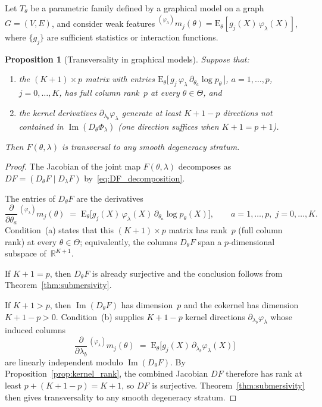 \documentclass[11pt,a4paper]{article}
\newtheorem{proposition}[theorem]{Proposition}
\newcommand{\E}{\mathrm{E}}
\newcommand{\R}{\mathbb{R}}
\begin{document}
Let $T_\theta$ be a parametric family defined by a graphical model
on a graph $G = (V,E)$, and consider weak features
${}^{(\varphi_\lambda)}m_j(\theta) =
\E_\theta[g_j(X)\,\varphi_\lambda(X)]$,
where $\{g_j\}$ are sufficient statistics or interaction functions.

\begin{proposition}[Transversality in graphical models]
\label{prop:graphical_transversality}
Suppose that:
\begin{enumerate}[label=\textnormal{(\alph*)}]
\item the $(K\!+\!1)\times p$ matrix with entries
  $\E_\theta\bigl[\,g_j\,\varphi_\lambda\,
  \partial_{\theta_a}\log p_\theta\,\bigr]$,
  $a = 1,\ldots,p$, $j = 0,\ldots,K$, has full column rank~$p$ at
  every $\theta\in\Theta$, and
\item the kernel derivatives
  $\partial_{\lambda_b}\varphi_\lambda$ generate at least
  $K\!+\!1-p$ directions not contained in
  $\operatorname{Im}(D_\theta\Phi_\lambda)$
  (one direction suffices when $K\!+\!1 = p\!+\!1$).
\end{enumerate}
Then $F(\theta,\lambda)$ is transversal to any smooth degeneracy
stratum.
\end{proposition}

\begin{proof}
The Jacobian of the joint map $F(\theta,\lambda)$ decomposes as
$DF = (D_\theta F \mid D_\lambda F)$ by~\eqref{eq:DF_decomposition}.

The entries of $D_\theta F$ are the derivatives
\[
  \frac{\partial}{\partial\theta_a}\,
  {}^{(\varphi_\lambda)}\!m_j(\theta)
  \;=\;
  \E_\theta\!\bigl[
  g_j(X)\,\varphi_\lambda(X)\,
  \partial_{\theta_a}\log p_\theta(X)
  \bigr],
  \qquad a = 1,\ldots,p,\; j = 0,\ldots,K.
\]
Condition~(a) states that this $(K\!+\!1)\times p$ matrix has rank~$p$
(full column rank) at every $\theta \in \Theta$; equivalently, the
columns $D_\theta F$ span a $p$-dimensional subspace of~$\R^{K+1}$.

If $K+1 = p$, then $D_\theta F$ is already surjective and the
conclusion follows from Theorem~\ref{thm:submersivity}.

If $K+1 > p$, then $\operatorname{Im}(D_\theta F)$ has dimension~$p$
and the cokernel has dimension $K+1-p > 0$.  Condition~(b) supplies
$K+1-p$ kernel directions $\partial_{\lambda_b}\varphi_\lambda$
whose induced columns
\[
  \frac{\partial}{\partial\lambda_b}\,
  {}^{(\varphi_\lambda)}\!m_j(\theta)
  \;=\;
  \E_\theta\!\bigl[
  g_j(X)\,\partial_{\lambda_b}\varphi_\lambda(X)
  \bigr]
\]
are linearly independent modulo $\operatorname{Im}(D_\theta F)$.  By
Proposition~\ref{prop:kernel_rank}, the combined Jacobian $DF$
therefore has rank at least $p + (K+1-p) = K+1$, so $DF$ is
surjective.
Theorem~\ref{thm:submersivity} then gives transversality to any
smooth degeneracy stratum.
\end{proof}
\end{document}
